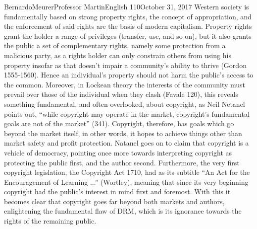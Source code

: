 \documentclass[12pt,letterpaper]{article}
\begin{document}
\begin{mla}{Bernardo}{Meurer}{Professor Martin}{English 110}{October 31, 2017}
    Western society is fundamentally based on strong property rights, the concept of appropriation, and the enforcement of said rights are the basis of modern capitalism. Property rights grant the holder a range of privileges (transfer, use, and so on), but it also grants the public a set of complementary rights, namely some protection from a malicious party, as a rights holder can only constrain others from using his property insofar as that doesn't impair a community's ability to thrive (Gordon 1555-1560). Hence an individual's property should not harm the public's access to the common. Moreover, in Lockean theory the interests of the community must prevail over those of the individual when they clash (Favale 120), this reveals something fundamental, and often overlooked, about copyright, as Neil Netanel points out, ``while copyright may operate in the market, copyright's fundamental goals are not of the market'' (341). Copyright, therefore, has goals which go beyond the market itself, in other words, it hopes to achieve things other than market safety and profit protection. Natanel goes on to claim that copyright is a vehicle of democracy, pointing once more towards interpreting copyright as protecting the public first, and the author second. Furthermore, the very first copyright legislation, the Copyright Act 1710, had as its subtitle ``An Act for the Encouragement of Learning ...'' (Wortley), meaning that since its very beginning copyright had the public's interest in mind first and foremost. With this it becomes clear that copyright goes far beyond both markets and authors, enlightening the fundamental flaw of DRM, which is its ignorance towards the rights of the remaining public.


\end{mla}
\end{document}

